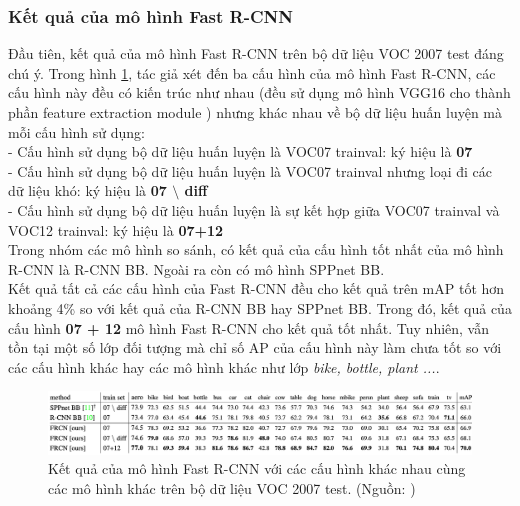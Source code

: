 {    \subsubsection*{Kết quả của mô hình Fast R-CNN}
    Đầu tiên, kết quả của mô hình Fast R-CNN trên bộ dữ liệu VOC 2007 test đáng chú ý.
    Trong hình \ref{fig:fast_rcnn_results_1}, tác giả xét đến ba cấu hình của mô hình Fast R-CNN, các cấu hình này đều có kiến trúc như nhau (đều sử dụng mô hình VGG16 cho thành phần feature extraction module ) nhưng khác nhau về bộ dữ liệu huấn luyện mà mỗi cấu hình sử dụng: \\
    - Cấu hình sử dụng bộ dữ liệu huấn luyện là VOC07 trainval: ký hiệu là \textbf{07} \\
    - Cấu hình sử dụng bộ dữ liệu huấn luyện là VOC07 trainval nhưng loại đi các dữ liệu khó: ký hiệu là \textbf{07 $\setminus$ diff} \\
    - Cấu hình sử dụng bộ dữ liệu huấn luyện là sự kết hợp giữa VOC07 trainval và VOC12 trainval: ký hiệu là \textbf{07+12} \\
    Trong nhóm các mô hình so sánh, có kết quả của cấu hình tốt nhất của mô hình R-CNN là R-CNN BB.
    Ngoài ra còn có mô hình SPPnet BB. \\
    Kết quả tất cả các cấu hình của Fast R-CNN đều cho kết quả trên mAP tốt hơn khoảng 4\% so với kết quả của R-CNN BB hay SPPnet BB.
    Trong đó, kết quả của cấu hình \textbf{07 + 12} mô hình Fast R-CNN cho kết quả tốt nhất.
    Tuy nhiên, vẫn tồn tại một số lớp đối tượng  mà chỉ số AP của cấu hình này làm chưa tốt so với các cấu hình khác hay các mô hình khác như lớp \textit{bike, bottle, plant ...}.

    \begin{figure}[H]
        \centering
        \includegraphics[width=15cm] {images/fast_rcnn_results_1}
        \caption{Kết quả của mô hình Fast R-CNN với các cấu hình khác nhau cùng các mô hình khác trên bộ dữ liệu VOC 2007 test. (Nguồn: \cite{girshick2015fast})}
        \label{fig:fast_rcnn_results_1}
    \end{figure}

}

